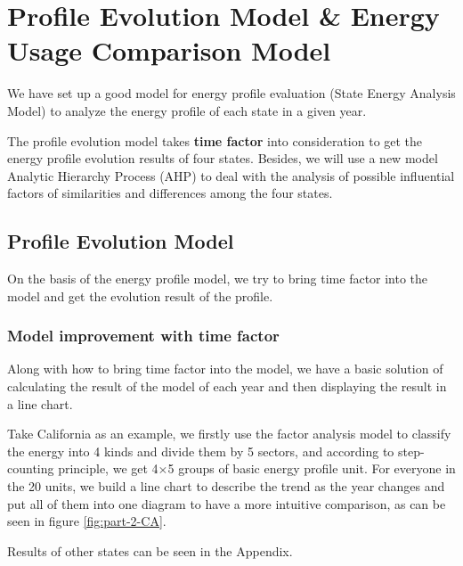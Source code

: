 \documentclass[a4paper,11pt]{article}
\begin{document}


\section{Profile Evolution Model \& Energy Usage Comparison Model}


\par We have set up a good model for energy profile evaluation (State Energy Analysis Model) to analyze the energy profile of each state in a given year. 
\par The profile evolution model takes \textbf{time factor} into consideration to get the energy profile evolution results of four states. Besides,
we will use a new model Analytic Hierarchy Process (AHP) to deal with the analysis of possible influential factors of similarities and differences among the four states.

\subsection{Profile Evolution Model}
\par On the basis of the energy profile model, we try to bring time factor into the model and get the evolution result of the profile. 

\subsubsection{Model improvement with time factor}
\par Along with how to bring time factor into the model, we have a basic solution of calculating the result of the model of each year and then displaying the result in a line chart. 

\par Take California as an example, we firstly use the factor analysis model to classify the energy into 4 kinds and divide them by 5 sectors, and according to step-counting principle, we get 4$\times$5 groups of basic energy profile unit. For everyone in the 20 units, we build a line chart to describe the trend as the year changes and put all of them into one diagram to have a more intuitive comparison, as can be seen in figure \ref{fig:part-2-CA}.  
\par Results of other states can be seen in the Appendix. %
\end{document}
